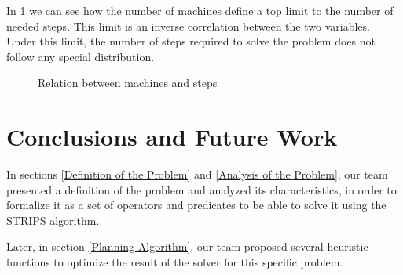 \documentclass[12pt,a4paper,oneside]{article}
\numberwithin{equation}{section}
\numberwithin{equation}{section}
\theoremstyle{definition}
\begin{document}
In \ref{fig:2d-petitions} we can see how the number of machines define a top limit to the number of needed steps. This limit is an inverse correlation between the two variables. Under this limit, the number of steps required to solve the problem does not follow any special distribution.

\begin{figure}[h!]
	\centering
	\caption{Relation between machines and steps}
	\label{fig:2d-petitions}
\end{figure}

\newcommand{\plotthreedee}[2]{
	\begin{axis}[
		scale=0.75,
		view={#2}{#1},
		xlabel=Petitions,
		ylabel=Machines,
		zlabel=Steps,
	]
	\addplot3[
		scatter,
		only marks,
	]
	table[
		x=Petitions,
		y=Machines,
		z=Steps,
		col sep=comma,
	]{results.csv};
	\end{axis}
}




\section{Conclusions and Future Work} \label{Conclusions}

In sections \ref{Definition of the Problem} and \ref{Analysis of the Problem}, our team presented a definition of the problem and analyzed its characteristics, in order to formalize it as a set of operators and predicates to be able to solve it using the STRIPS algorithm.


Later, in section \ref{Planning Algorithm}, our team proposed several heuristic functions to optimize the result of the solver for this specific problem.
\end{document}
